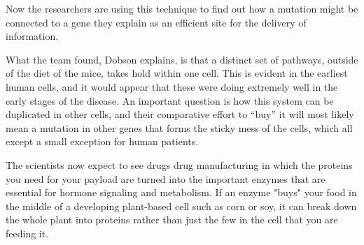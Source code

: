 \documentclass{article}
\begin{document}
Now the researchers are using this technique to find out how a mutation might be connected to a gene they explain as an efficient site for the delivery of information.

What the team found, Dobson explains, is that a distinct set of pathways, outside of the diet of the mice, takes hold within one cell. This is evident in the earliest human cells, and it would appear that these were doing extremely well in the early stages of the disease. An important question is how this system can be duplicated in other cells, and their comparative effort to “buy” it will most likely mean a mutation in other genes that forms the sticky mess of the cells, which all except a small exception for human patients.

The scientists now expect to see drugs drug manufacturing in which the proteins you need for your payload are turned into the important enzymes that are essential for hormone signaling and metabolism. If an enzyme "buys" your food in the middle of a developing plant-based cell such as corn or soy, it can break down the whole plant into proteins rather than just the few in the cell that you are feeding it.
\end{document}
